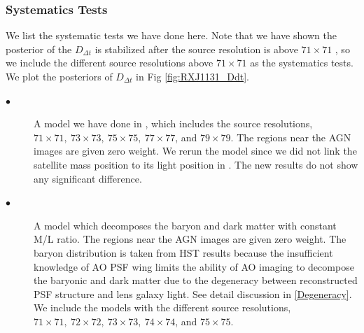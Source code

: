 \documentclass[useAMS,usenatbib]{mnras}
\newcommand\todo[1]{\textcolor{red}{#1}}
\def\dt{D_{\Delta t}}
\begin{document}
\subsubsection{Systematics Tests}
We list the systematic tests we have done here. Note that we have shown the posterior of the $\dt$ is stabilized after the source resolution is above $71\times71$ \citep{GChenEtal16}, so we include the different source resolutions above $71\times71$ as the systematics tests. We plot the posteriors of $\dt$ in Fig \ref{fig:RXJ1131_Ddt}.
\begin{description}
  \item[$\bullet$] A model we have done in \cite{GChenEtal16}, which includes the source resolutions, $71\times71,~73\times73,~75\times75,~77\times77$, and $79\times79$.  
  The regions near the AGN images are given zero weight. We rerun the model since we did not link the satellite mass position to its light position in \citet{GChenEtal16}. The new results do not show any significant difference.
  \item[$\bullet$] A model which decomposes the baryon and dark matter with constant M/L ratio. 
  The regions near the AGN images are given zero weight.
  The baryon distribution is taken from HST results because the insufficient knowledge of AO PSF wing limits the ability of AO imaging to decompose the baryonic and dark matter due to the degeneracy between reconstructed PSF structure and lens galaxy light. See detail discussion in \ref{Degeneracy}. We include the models with the different source resolutions, $71\times71,~72\times72,~73\times73,~74\times74$, and $75\times75$.
\end{description}
\end{document}
